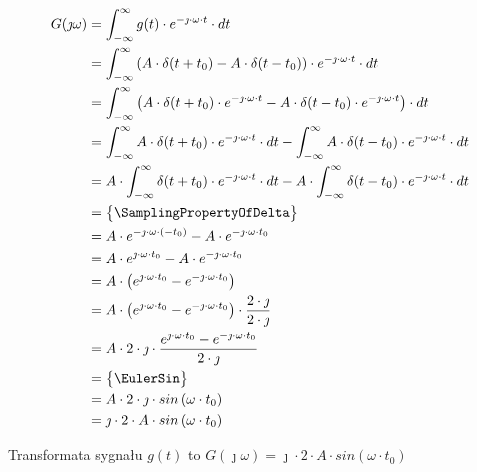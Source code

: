 \begin{task}
\begin{align*}
G(\jmath \omega )&=\int_{-\infty }^{\infty}g(t) \cdot e^{-\jmath \cdot \omega \cdot t}\cdot dt\\
&=\int_{-\infty }^{\infty}\left( A \cdot \delta(t+t_0) - A \cdot \delta(t-t_0) \right) \cdot e^{-\jmath \cdot \omega \cdot t}\cdot dt\\
&=\int_{-\infty }^{\infty}\left( A \cdot \delta(t+t_0)\cdot e^{-\jmath \cdot \omega \cdot t} - A \cdot \delta(t-t_0)\cdot e^{-\jmath \cdot \omega \cdot t} \right) \cdot dt\\
&=\int_{-\infty }^{\infty} A \cdot \delta(t+t_0)\cdot e^{-\jmath \cdot \omega \cdot t}\cdot dt - \int_{-\infty }^{\infty} A \cdot \delta(t-t_0)\cdot e^{-\jmath \cdot \omega \cdot t} \cdot dt\\
&= A \cdot \int_{-\infty }^{\infty} \delta(t+t_0)\cdot e^{-\jmath \cdot \omega \cdot t}\cdot dt - A \cdot \int_{-\infty }^{\infty}  \delta(t-t_0)\cdot e^{-\jmath \cdot \omega \cdot t} \cdot dt\\
&=\begin{Bmatrix}
\SamplingPropertyOfDelta
\end{Bmatrix}\\
&= A \cdot e^{-\jmath \cdot \omega \cdot (-t_0)} - A \cdot e^{-\jmath \cdot \omega \cdot t_0}\\
&= A \cdot e^{\jmath \cdot \omega \cdot t_0} - A \cdot e^{-\jmath \cdot \omega \cdot t_0}\\
&= A \cdot \left(e^{\jmath \cdot \omega \cdot t_0} - e^{-\jmath \cdot \omega \cdot t_0}\right)\\
&= A \cdot \left(e^{\jmath \cdot \omega \cdot t_0} - e^{-\jmath \cdot \omega \cdot t_0}\right) \cdot \frac{2\cdot \jmath}{2\cdot \jmath}\\
&= A \cdot 2\cdot \jmath \cdot \frac{e^{\jmath \cdot \omega \cdot t_0} - e^{-\jmath \cdot \omega \cdot t_0}}{2\cdot \jmath}\\
&=\begin{Bmatrix}
\EulerSin
\end{Bmatrix}\\
&= A \cdot 2\cdot \jmath \cdot sin\left( \omega \cdot t_0\right)\\
&= \jmath \cdot 2 \cdot A \cdot sin\left( \omega \cdot t_0\right)\\
\end{align*}

Transformata sygnału $g(t)$ to $G(\jmath \omega)=\jmath \cdot 2 \cdot A \cdot sin\left( \omega \cdot t_0\right)$
\\


\end{task}
